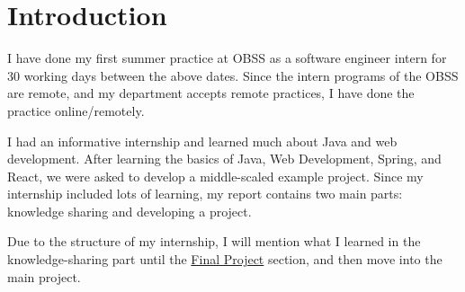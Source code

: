 \section{Introduction}

I have done my first summer practice at OBSS as a software engineer intern for 30 working days between the above dates. Since the intern programs of the OBSS are remote, and my department accepts remote practices, I have done the practice online/remotely.

I had an informative internship and learned much about Java and web development. After learning the basics of Java, Web Development, Spring, and React, we were asked to develop a middle-scaled example project. Since my internship included lots of learning, my report contains two main parts: knowledge sharing and developing a project.

Due to the structure of my internship, I will mention what I learned in the knowledge-sharing part until the \hyperref[final-project]{Final Project} section, and then move into the main project.
